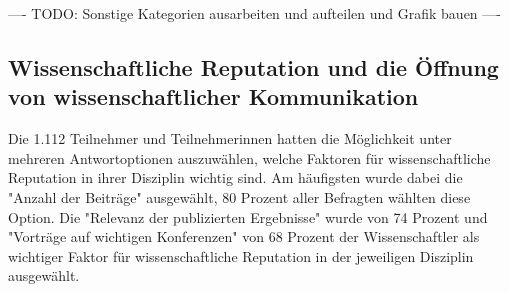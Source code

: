 ---- TODO: Sonstige Kategorien ausarbeiten und aufteilen und Grafik bauen ----

\subsection{Wissenschaftliche Reputation und die Öffnung von wissenschaftlicher Kommunikation}

Die 1.112 Teilnehmer und Teilnehmerinnen hatten die Möglichkeit unter mehreren Antwortoptionen auszuwählen, welche Faktoren für wissenschaftliche Reputation in ihrer Disziplin wichtig sind. Am häufigsten wurde dabei die "Anzahl der Beiträge" ausgewählt, 80 Prozent aller Befragten wählten diese Option. Die "Relevanz der publizierten Ergebnisse" wurde von 74 Prozent und "Vorträge auf wichtigen Konferenzen" von 68 Prozent der Wissenschaftler als wichtiger Faktor für wissenschaftliche Reputation in der jeweiligen Disziplin ausgewählt.

